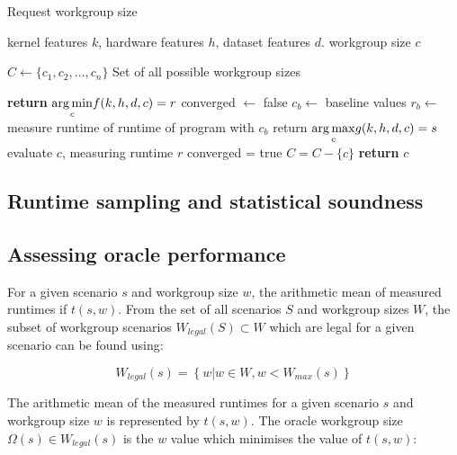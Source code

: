 \begin{algorithm}
\caption{Request workgroup size}\label{bar}
\begin{algorithmic}[1]
\Require kernel features $k$, hardware features $h$, dataset features $d$.
\Ensure workgroup size $c$

\State $C \leftarrow \{ c_1, c_2,\ldots, c_n \}$
\Comment Set of all possible workgroup sizes

    \State \textbf{return} $\underset{c}{\operatorname*{arg\,min}} f(k,h,d,c) = r$
\Else
   \State converged $\leftarrow$ false
   \State $c_b \leftarrow$ baseline values
   \State $r_b \leftarrow$ measure runtime of runtime of program with $c_b$
     \State return $\underset{c}{\operatorname*{arg\,max}} g(k,h,d,c) = s$
     \State evaluate $c$, measuring runtime $r$\;
       \State converged = true
     \Else
       \State $C = C - \{c\}$
     \EndIf
   \EndWhile
   \State \textbf{return} $c$
\EndIf
\end{algorithmic}
\end{algorithm}


\subsection{Runtime sampling and statistical soundness}


\subsection{Assessing oracle performance}
For a given scenario $s$ and workgroup size $w$, the arithmetic mean
of measured runtimes if $t(s,w)$. From the set of all scenarios $S$
and workgroup sizes $W$, the subset of workgroup scenarios
$W_{legal}(S) \subset W$ which are legal for a given scenario can be
found using:

\begin{equation}
W_{legal}(s) = \left\{w | w \in W, w < W_{max}(s) \right\}
\end{equation}

The arithmetic mean of the measured runtimes for a given scenario $s$
and workgroup size $w$ is represented by $t(s,w)$. The oracle
workgroup size $\Omega(s) \in W_{legal}(s)$ is the $w$ value which
minimises the value of $t(s,w)$:


